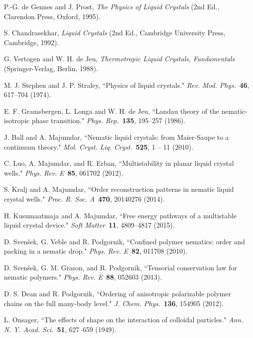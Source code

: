 \documentclass[jcp,aps,twocolumn,showpacs,supergroupedaddress,epsfig,amsmath,amssymb,eqsecnum]{revtex4}
\begin{document}
\begin{thebibliography}{99}

P.-G. de Gennes and J. Prost, {\em The Physics of Liquid Crystals} (2nd Ed., Clarendon Press, Oxford, 1995).

S. Chandrasekhar, {\em Liquid Crystals} (2nd Ed., Cambridge University Press, Cambridge, 1992). 

G. Vertogen and W. H. de Jeu, 
{\em Thermotropic Liquid Crystals, Fundamentals} 
(Springer-Verlag, Berlin, 1988).

M. J. Stephen and J. P. Straley, ``Physics of liquid crystals."
{\em Rev. Mod. Phys.}~{\bf 46}, 617--704 (1974).

E. F. Gramsbergen, L. Longa and W. H. de Jeu, ``Landau theory of the nematic-isotropic phase transition." 
{\em Phys. Rep.}~{\bf 135}, 195--257 (1986).

J. Ball and A. Majumdar, ``Nematic liquid crystals: from Maier-Saupe to a continuum theory." 
{\em Mol. Cryst. Liq. Cryst.}~{\bf 525}, 1 -- 11 (2010).

C. Luo, A. Majumdar, and R. Erban, ``Multistability in planar liquid crystal wells." 
{\em Phys. Rev. E}~{\bf 85}, 061702 (2012).

S. Kralj and A. Majumdar, ``Order reconstruction patterns in nematic liquid crystal wells." 
{\em Proc. R. Soc. A}~{\bf 470}, 20140276 (2014).

H. Kusumaatmaja and A. Majumdar, 
``Free energy pathways of a multistable liquid crystal device." 
{\em Soft Matter}~{\bf 11}, 4809--4817 (2015).

D. Sven\v{s}ek, G. Veble and R. Podgornik, ``Confined polymer nematics: order and packing in a nematic drop." 
{\em Phys. Rev. E}~{\bf 82}, 011708 (2010).

D. Sven\v{s}ek, G. M. Grason, and R. Podgornik, 
``Tensorial conservation law for nematic polymers."
{\em Phys. Rev. E}~{\bf 88}, 052603 (2013).

D. S. Dean and R. Podgornik, 
``Ordering of anisotropic polarizable polymer chains on the full many-body level."
{\em J. Chem. Phys.}~{\bf 136}, 154905 (2012).

L. Onsager, ``The effects of shape on the interaction of colloidal particles." 
{\em Ann. N. Y. Acad. Sci.}~{\bf 51}, 627--659 (1949). 


\end{thebibliography}
\end{document}
